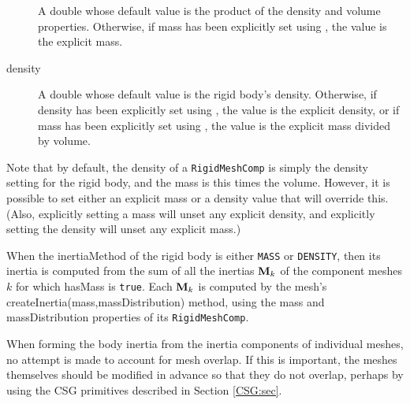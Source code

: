 \begin{description}
A double whose default value is the product of the {\sf
density} and {\sf volume} properties. Otherwise,
if {\sf mass} has been explicitly set using
,
the value is the explicit mass.

\item[density]\mbox{}

A double whose default value is the rigid body's
density.  Otherwise, if {\sf density} has been explicitly set using
,
the value is the explicit density, or if {\sf mass} has been explicitly
set using
, the
value is the explicit {\sf mass} divided by {\sf volume}.

\end{description}

Note that by default, the {\sf density} of a {\tt RigidMeshComp} is
simply the {\sf density} setting for the rigid body, and the {\sf
mass} is this times the {\sf volume}. However, it is possible to set
either an explicit mass or a density value that will override
this. (Also, explicitly setting a mass will unset any explicit
density, and explicitly setting the density will unset any explicit
mass.)

When the {\sf inertiaMethod} of the rigid body is either {\tt MASS} or
{\tt DENSITY}, then its inertia is computed from the sum of all the
inertias ${\bf M}_k$ of the component meshes $k$ for which {\sf hasMass} is
{\tt true}. Each ${\bf M}_k$ is computed by the mesh's
%
{createInertia(mass,massDistribution)} method,
using the {\sf mass} and {\sf massDistribution} properties of
its {\tt RigidMeshComp}.

\begin{sideblock}
When forming the body inertia from the inertia components of
individual meshes, no attempt is made to account for mesh overlap.  If
this is important, the meshes themselves should be modified in advance
so that they do not overlap, perhaps by using the CSG primitives
described in Section \ref{CSG:sec}.
\end{sideblock}

